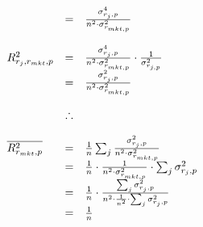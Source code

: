 \documentclass[11pt, letterpaper, doublespacing]{article}
\begin{document}
\[\begin{array}{l c l}
                                                        & = & \frac{\sigma_{r_{j}, p}^{4}}{n^{2} \cdot \sigma_{r_{mkt, p}}^{2}} \\ \\
  R_{r_{j}, r_{mkt}, p}^{2} & = & \frac{\sigma_{r_{j}, p}^{4}}{n^{2} \cdot \sigma_{r_{mkt, p}}^{2}} \cdot \frac{1}{\sigma_{r_{j, p}}^{2}} \\
                            & = & \frac{\sigma_{r_{j}, p}^{2}}{n^{2} \cdot \sigma_{r_{mkt, p}}^{2}} \\ \\  
                            & \therefore  & \\ \\
  \overline{R_{r_{mkt}, p}^{2}} & = & \frac{1}{n} \sum_{j} \frac{\sigma_{r_{j}, p}^{2}}{n^{2} \cdot \sigma_{r_{mkt, p}}^{2}} \\
                                & = & \frac{1}{n} \cdot \frac{1}{n^{2} \cdot \sigma_{r_{mkt, p}}^{2}} \cdot \sum_{j} \sigma_{r_{j}, p}^{2} \\
                                & = & \frac{1}{n} \cdot \frac{\sum_{j} \sigma_{r_{j}, p}^{2}}{n^{2} \cdot \frac{1}{n^{2}} \cdot \sum_{j} \sigma_{r_{j}, p}^{2}} \\
                                & = & \frac{1}{n} \\
\end{array}
\]

\newpage




\clearpage
\theendnotes
\end{document}
